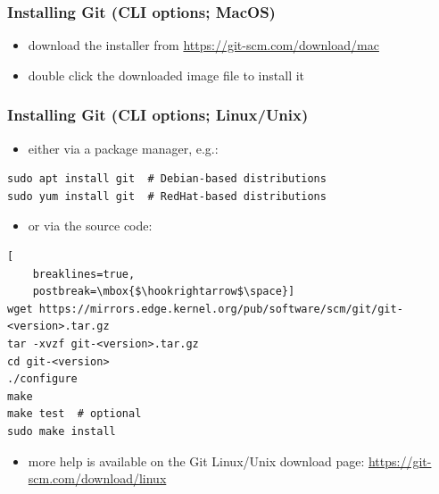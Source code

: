 \begin{frame}
\frametitle{Installing Git (CLI options; MacOS)}
\begin{itemize}
    \item download the installer from \url{https://git-scm.com/download/mac}
    \item double click the downloaded image file to install it
\end{itemize}
\end{frame}


\begin{frame}[fragile]
\frametitle{Installing Git (CLI options; Linux/Unix)}
\begin{itemize}
    \item either via a package manager, e.g.:
\end{itemize}

\begin{lstlisting}
sudo apt install git  # Debian-based distributions
sudo yum install git  # RedHat-based distributions
\end{lstlisting}

\begin{itemize}
    \item or via the source code:
\end{itemize}

\begin{lstlisting}[
    breaklines=true,
    postbreak=\mbox{$\hookrightarrow$\space}]
wget https://mirrors.edge.kernel.org/pub/software/scm/git/git-<version>.tar.gz
tar -xvzf git-<version>.tar.gz
cd git-<version>
./configure
make
make test  # optional
sudo make install
\end{lstlisting}

\begin{itemize}
    \item more help is available on the Git Linux/Unix download page:
        \url{https://git-scm.com/download/linux}
\end{itemize}
\end{frame}

